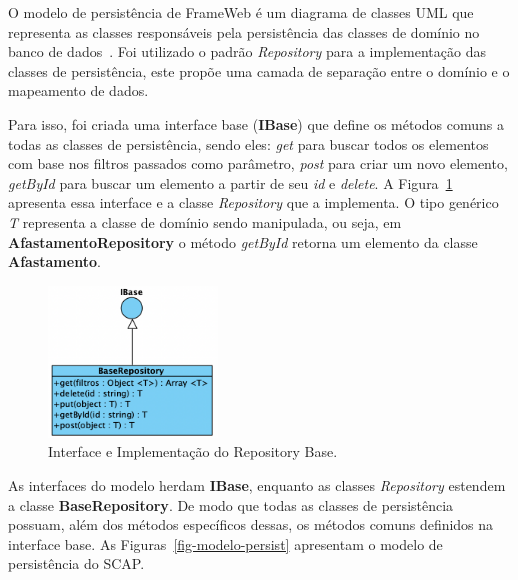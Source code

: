 O modelo de persistência de FrameWeb é um diagrama de classes UML que representa
as classes responsáveis pela persistência das classes de domínio no banco de dados~\cite{souza:2007}.
Foi utilizado o padrão \textit{Repository} para a implementação das classes de persistência,
este propõe uma camada de separação entre o domínio e o mapeamento de dados.



Para isso, foi criada uma interface base (\textbf{IBase}) que define os métodos comuns a todas as classes de persistência,
sendo eles: \textit{get} para buscar todos os elementos com base nos filtros passados como parâmetro,
\textit{post} para criar um novo elemento, \textit{getById} para buscar um elemento a partir de seu
\textit{id} e \textit{delete}. A Figura~\ref{fig-modelo-persist-base} apresenta essa interface e a
classe \textit{Repository} que a implementa. O tipo genérico \textit{T} representa a classe de domínio
sendo manipulada, ou seja, em \textbf{AfastamentoRepository} o método \textit{getById}
retorna um elemento da classe \textbf{Afastamento}.


\begin{figure}[h!]
    \centering
    \includegraphics[width=0.4\textwidth]{figuras/fig-modelo-persist-base.png}
    \caption{Interface e Implementação do Repository Base.}
    \label{fig-modelo-persist-base}
\end{figure}


As interfaces do modelo herdam \textbf{IBase}, enquanto as classes \textit{Repository} estendem a
classe \textbf{BaseRepository}. De modo que todas as classes de persistência possuam, além dos métodos
específicos dessas, os métodos comuns definidos na interface base. As Figuras~\ref{fig-modelo-persist}
apresentam o modelo de persistência do SCAP.

